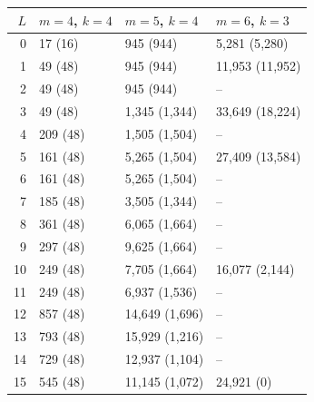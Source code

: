 \begin{tabular}{rlll}
\toprule
$L$ & $m=4$, $k=4$ & $m=5$, $k=4$ & $m=6$, $k=3$\\
\midrule
0 & 17 (16) & 945 (944) & 5{,}281 (5{,}280)\\
1 & 49 (48) & 945 (944) & 11{,}953 (11{,}952)\\
2 & 49 (48) & 945 (944) & --\\
3 & 49 (48) & 1{,}345 (1{,}344) & 33{,}649 (18{,}224)\\
4 & 209 (48) & 1{,}505 (1{,}504) & --\\
5 & 161 (48) & 5{,}265 (1{,}504) & 27{,}409 (13{,}584)\\
6 & 161 (48) & 5{,}265 (1{,}504) & --\\
7 & 185 (48) & 3{,}505 (1{,}344) & --\\
8 & 361 (48) & 6{,}065 (1{,}664) & --\\
9 & 297 (48) & 9{,}625 (1{,}664) & --\\
10 & 249 (48) & 7{,}705 (1{,}664) & 16{,}077 (2{,}144)\\
11 & 249 (48) & 6{,}937 (1{,}536) & --\\
12 & 857 (48) & 14{,}649 (1{,}696) & --\\
13 & 793 (48) & 15{,}929 (1{,}216) & --\\
14 & 729 (48) & 12{,}937 (1{,}104) & --\\
15 & 545 (48) & 11{,}145 (1{,}072) & 24{,}921 (0)\\
\bottomrule
\end{tabular}
